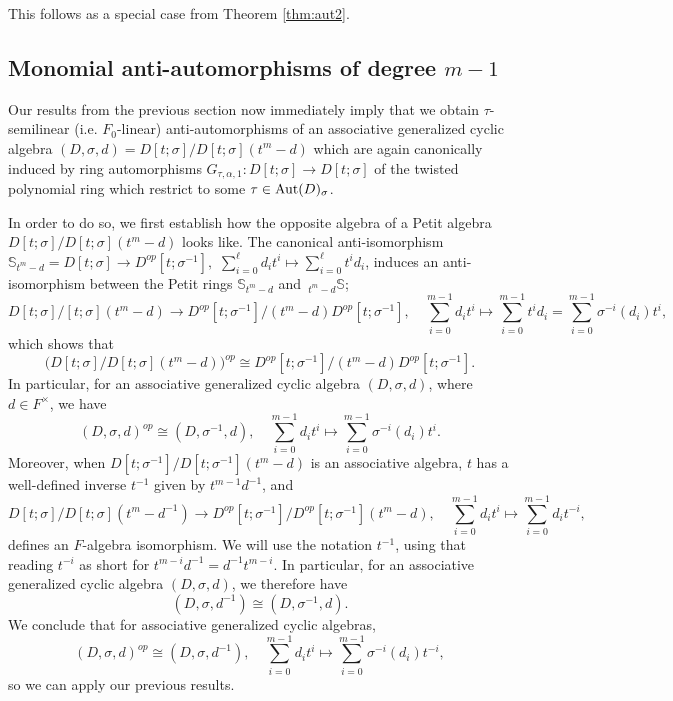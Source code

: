 \documentclass{amsart}
\theoremstyle{plain}
\theoremstyle{definition}
\numberwithin{equation}{section}
\numberwithin{figure}{section}
\begin{document}
This follows as a special case from Theorem \ref{thm:aut2}.



\subsection{Monomial anti-automorphisms of degree $m-1$}

Our results from the previous section now immediately imply that we  obtain $\tau$-semilinear (i.e. $F_0$-linear)  anti-automorphisms of an associative  generalized cyclic  algebra $(D, \sigma, d)=D[t;\sigma]/D[t;\sigma](t^m-d)$ which are again canonically induced by ring automorphisms $ G_{\tau,\alpha,1}:D[t;\sigma]\to D[t;\sigma]$  of the twisted polynomial ring  which restrict to some $\tau\in {\rm Aut}(D)_\sigma$.


In order to do so, we first establish how the opposite algebra of a Petit algebra $D[t;\sigma]/ D[t;\sigma](t^m-d)$ looks like. The canonical anti-isomorphism
 $\mathbb{S}_{t^m-d}=D[t;\sigma]\to D^{op}[t;\sigma^{-1}], $ $\sum_{i=0}^\ell d_it^i \mapsto \sum_{i=0}^\ell t^i d_i $, induces an anti-isomorphism between the Petit rings $\mathbb{S}_{t^m-d}$ and $\,_{t^m-d}\mathbb{S}$;
$$D[t;\sigma]/[t;\sigma]  (t^m-d) \to D^{op}[t;\sigma^{-1}]/ (t^m-d) D^{op}[t;\sigma^{-1}],\quad  \sum_{i=0}^{m-1} d_it^i \mapsto \sum_{i=0}^{m-1} t^i d_i = \sum_{i=0}^{m-1} \sigma^{-i}(d_i)t^i  ,$$
which shows that
$$\big(D[t;\sigma]/ D[t;\sigma](t^m-d)\big)^{op} \cong D^{op}[t;\sigma^{-1}]/ (t^m-d) D^{op}[t;\sigma^{-1}].$$
In particular, for an associative generalized cyclic algebra $(D,\sigma,d)$, where $d\in F^\times$, we have
$$(D,\sigma, d)^{op}\cong (D,\sigma^{-1},d), \quad
\sum_{i=0}^{m-1} d_it^i \mapsto \sum_{i=0}^{m-1} \sigma^{-i}(d_i)t^i  .$$
Moreover, when $D[t;\sigma^{-1}]/ D[t;\sigma^{-1}](t^m-d)$ is an associative algebra, $t$ has a well-defined inverse $t^{-1}$ given by $t^{m-1}d^{-1}$, and
$$ D[t;\sigma]/ D[t;\sigma](t^m-d^{-1}) \to  D^{op}[t;\sigma^{-1}]/ D^{op}[t;\sigma^{-1}](t^m-d)
,\quad  \sum_{i=0}^{m-1} d_it^i \mapsto \sum_{i=0}^{m-1}d_i t^{-i} ,$$
defines an $F$-algebra isomorphism. We will use the notation $t^{-1}$, using that
reading $t^{-i}$ as short for $t^{m-i}d^{-1}=d^{-1}t^{m-i}$.
In particular, for an associative generalized cyclic algebra $(D,\sigma,d)$, we therefore have
$$(D,\sigma, d^{-1})\cong (D,\sigma^{-1},d).$$
We conclude that for associative generalized cyclic algebras,
$$(D,\sigma, d)^{op}\cong (D,\sigma,d^{-1}),  \quad
\sum_{i=0}^{m-1} d_it^i \mapsto \sum_{i=0}^{m-1} \sigma^{-i}(d_i)t^{-i} ,$$
so we can apply our previous results.
\end{document}
